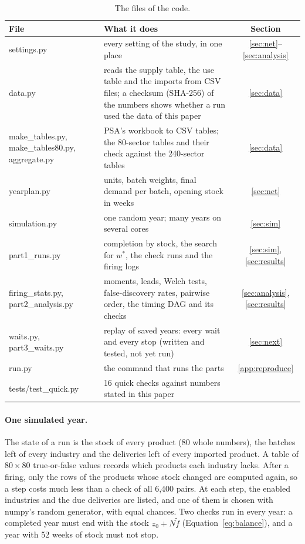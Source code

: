 \documentclass[11pt]{article}
\begin{document}
\begin{table}[htbp]
\centering\small
\caption{The files of the code.}
\label{tab:files}
\begin{tabularx}{\textwidth}{@{}>{\ttfamily\raggedright\arraybackslash}p{}Lc@{}}
\toprule
\normalfont File & What it does & Section\\
\midrule
settings.py & every setting of the study, in one place & \ref{sec:net}--\ref{sec:analysis}\\
data.py & reads the supply table, the use table and the imports from CSV files; a checksum (SHA-256) of the numbers shows whether a run used the data of this paper & \ref{sec:data}\\
make\_tables.py, make\_tables80.py, aggregate.py & PSA's workbook to CSV tables; the 80-sector tables and their check against the 240-sector tables & \ref{sec:data}\\
yearplan.py & units, batch weights, final demand per batch, opening stock in weeks & \ref{sec:net}\\
simulation.py & one random year; many years on several cores & \ref{sec:sim}\\
part1\_runs.py & completion by stock, the search for $w^*$, the check runs and the firing logs & \ref{sec:sim}, \ref{sec:results}\\
firing\_stats.py, part2\_analysis.py & moments, leads, Welch tests, false-discovery rates, pairwise order, the timing DAG and its checks & \ref{sec:analysis}, \ref{sec:results}\\
waits.py, part3\_waits.py & replay of saved years: every wait and every stop (written and tested, not yet run) & \ref{sec:next}\\
run.py & the command that runs the parts & \ref{app:reproduce}\\
tests/test\_quick.py & 16 quick checks against numbers stated in this paper & \\
\bottomrule
\end{tabularx}
\end{table}

\paragraph{One simulated year.} The state of a run is the stock of every product (80 whole numbers), the batches left of every industry and the deliveries left of every imported product. A table of $80\times80$ true-or-false values records which products each industry lacks. After a firing, only the rows of the products whose stock changed are computed again, so a step costs much less than a check of all 6{,}400 pairs. At each step, the enabled industries and the due deliveries are listed, and one of them is chosen with numpy's random generator, with equal chances. Two checks run in every year: a completed year must end with the stock $z_0+N\tilde f$ (Equation~\ref{eq:balance}), and a year with 52 weeks of stock must not stop.
\end{document}
